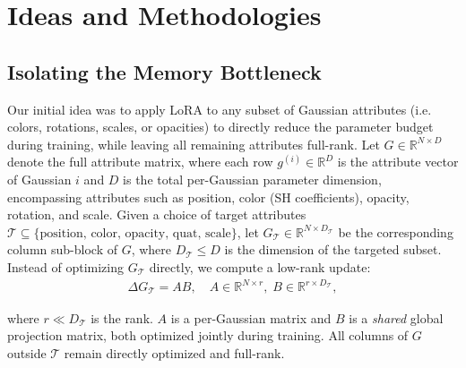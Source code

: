 \documentclass[sigconf]{acmart}
\begin{document}

\section{Ideas and Methodologies}
\label{sec:method}

\subsection{Isolating the Memory Bottleneck}
Our initial idea was to apply LoRA to any subset of Gaussian attributes (i.e.
colors, rotations, scales, or opacities) to directly reduce the parameter
budget during training, while leaving all remaining attributes full-rank.
Let $G \in \mathbb{R}^{N \times D}$ denote the full attribute matrix, where
each row $g^{(i)} \in \mathbb{R}^{D}$ is the attribute vector of Gaussian $i$
and $D$ is the total per-Gaussian parameter dimension, encompassing attributes
such as position, color (SH coefficients), opacity, rotation, and scale. Given
a choice of target attributes $\mathcal{T} \subseteq \{\text{position, color,
opacity, quat, scale}\}$, let
$G_{\mathcal{T}} \in \mathbb{R}^{N \times D_{\mathcal{T}}}$ be the
corresponding column sub-block of $G$, where $D_{\mathcal{T}} \leq D$ is the
dimension of the targeted subset. Instead of optimizing $G_{\mathcal{T}}$
directly, we compute a low-rank update:
\begin{align}
  \Delta G_{\mathcal{T}} = A B, \quad A \in \mathbb{R}^{N \times r},\; B \in
  \mathbb{R}^{r \times D_{\mathcal{T}}},
\end{align}

where $r \ll D_{\mathcal{T}}$ is the rank. $A$ is a per-Gaussian matrix and
$B$ is a \emph{shared} global projection matrix, both optimized jointly during
training. All columns of $G$ outside $\mathcal{T}$ remain directly optimized
and full-rank.
\end{document}
